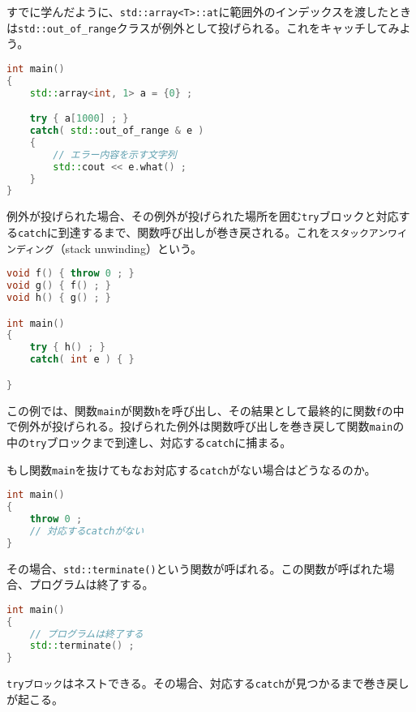 すでに学んだように、\texttt{std::array<T>::at}に範囲外のインデックスを渡したときは\texttt{std::out\_of\_range}クラスが例外として投げられる。これをキャッチしてみよう。

\begin{lstlisting}[language={C++}]
int main()
{
    std::array<int, 1> a = {0} ;

    try { a[1000] ; }
    catch( std::out_of_range & e )
    {
        // エラー内容を示す文字列
        std::cout << e.what() ;
    }
}
\end{lstlisting}


例外が投げられた場合、その例外が投げられた場所を囲む\texttt{try}ブロックと対応する\texttt{catch}に到達するまで、関数呼び出しが巻き戻される。これを\texttt{スタックアンワインディング}（stack unwinding）という。

\begin{lstlisting}[language={C++}]
void f() { throw 0 ; } 
void g() { f() ; }
void h() { g() ; }

int main()
{
    try { h() ; }
    catch( int e ) { }

}
\end{lstlisting}

この例では、関数\texttt{main}が関数\texttt{h}を呼び出し、その結果として最終的に関数\texttt{f}の中で例外が投げられる。投げられた例外は関数呼び出しを巻き戻して関数\texttt{main}の中の\texttt{try}ブロックまで到達し、対応する\texttt{catch}に捕まる。

もし関数\texttt{main}を抜けてもなお対応する\texttt{catch}がない場合はどうなるのか。

\begin{lstlisting}[language={C++}]
int main()
{
    throw 0 ;
    // 対応するcatchがない
}
\end{lstlisting}

その場合、\texttt{std::terminate()}という関数が呼ばれる。この関数が呼ばれた場合、プログラムは終了する。

\begin{lstlisting}[language={C++}]
int main()
{
    // プログラムは終了する
    std::terminate() ;
}
\end{lstlisting}

\texttt{tryブロック}はネストできる。その場合、対応する\texttt{catch}が見つかるまで巻き戻しが起こる。

